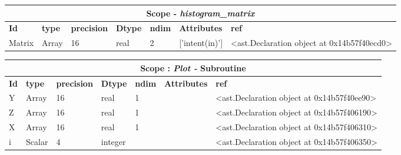 \documentclass{report}
\begin{document}
\begin{center}
\begin{longtable}{|p{3.5cm}|p{1.5cm}|p{1.5cm}|p{1.5cm}|p{1cm}|p{2cm}|p{4cm}| }
\hline
\multicolumn{7}{|c|}{\textbf{Scope} -  \textbf{\textit{histogram\_matrix}}} \\ 
\hline
\textbf{Id} & \textbf{type} & \textbf{precision} & \textbf{Dtype} & \textbf{ndim} & \textbf{Attributes} & \textbf{ref} \\\hline

Matrix & Array & 16 & real & 2 & ['intent(in)'] & <ast.Declaration object at 0x14b57f40ecd0> \\\hline

\end{longtable}
\end{center}

 \vspace{1cm}

\begin{center}
\begin{longtable}{|p{3.5cm}|p{1.5cm}|p{1.5cm}|p{1.5cm}|p{1cm}|p{2cm}|p{4cm}| }
\hline
\multicolumn{7}{|c|}{\textbf{Scope : \qquad}  \textbf{\textit{Plot - }Subroutine}}\\ 
\hline
\textbf{Id} & \textbf{type} & \textbf{precision} & \textbf{Dtype} & \textbf{ndim} & \textbf{Attributes} & \textbf{ref} \\\hline

Y & Array & 16 & real & 1 &  & <ast.Declaration object at 0x14b57f40ee90> \\\hline

Z & Array & 16 & real & 1 &  & <ast.Declaration object at 0x14b57f406190> \\\hline

X & Array & 16 & real & 1 &  & <ast.Declaration object at 0x14b57f406310> \\\hline

i & Scalar & 4 & integer &  &  & <ast.Declaration object at 0x14b57f406350> \\\hline

\end{longtable}
\end{center}

 \vspace{1cm}
\end{document}
